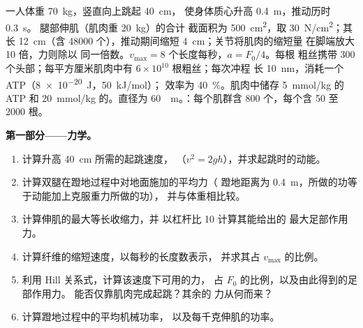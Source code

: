 \begin{problem}
\label{pb:b2:muscle-movement:1}
一人体重 \qty{70}{kg}，竖直向上跳起 \qty{40}{cm}，
使身体质心升高 \qty{0.4}{m}，推动历时 \qty{0.3}{s}。
腿部伸肌（肌肉重 \qty{20}{kg}）的合计
截面积为 \qty{500}{cm^2}，取 \qty{30}{N/cm^2}；其
长 \qty{12}{cm}（含 \num{48000} 个），推动期间缩短
\qty{4}{cm}；关节将肌肉的缩短量
在脚端放大 \num{10} 倍，力则除以
同一倍数。$v_{\max} = 8$ 个长度每秒，$a = F_0/4$。每根
粗丝携带 \num{300} 个头部；每平方厘米肌肉中有 $6\times
10^{10}$ 根粗丝；每次冲程
长 \qty{10}{nm}，消耗一个 ATP（\qty{8e-20}{J}，\qty{50}{kJ/mol}）；
效率为 \qty{40}{\%}。肌肉中储存 \qty{5}{mmol/kg} 的 ATP 和
\qty{20}{mmol/kg} 的。直径为 \qty{60}{\micro
m}。：每个肌群含 \num{800} 个，每个含 \num{50} 至
\num{2000} 根。

\medskip
\noindent\textbf{第一部分——力学。}
\begin{enumerate}
  \item 计算升高 \qty{40}{cm} 所需的起跳速度，
        （$v^{2} = 2gh$），并求起跳时的动能。
  \item 计算双腿在蹬地过程中对地面施加的平均力（
        蹬地距离为 \qty{0.4}{m}，所做的功等于动能加上克服重力所做的功），
        并与体重相比较。
  \item 计算伸肌的最大等长收缩力，并
        以杠杆比 10 计算其能给出的
        最大足部作用力。
  \item 计算纤维的缩短速度，以每秒的长度数表示，
        并求其占 $v_{\max}$ 的比例。
  \item 利用 Hill 关系式，计算该速度下可用的力，
        占 $F_0$ 的比例，以及由此得到的足部作用力。
        能否仅靠肌肉完成起跳？其余的
        力从何而来？
  \item 计算蹬地过程中的平均机械功率，
        以及每千克伸肌的功率。
\end{enumerate}


\end{problem}
